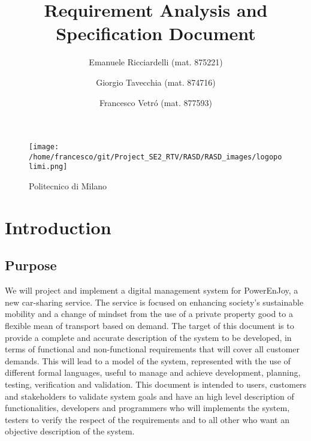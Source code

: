 \documentclass[10pt, a4paper,titlepage]{article}
\begin{document}
\begin{titlepage}
\title{Requirement Analysis and Specification Document}
\author{Emanuele Ricciardelli (mat. 875221) \and Giorgio Tavecchia (mat. 874716) \and Francesco Vetr\'o (mat. 877593)}
\begin{figure}
\texttt{[image: /home/francesco/git/Project\_SE2\_RTV/RASD/RASD\_images/logopolimi.png]}
\caption{Politecnico di Milano}
\label{fig:logo}
\end{figure}
\maketitle
\end{titlepage}
\tableofcontents
\pagebreak
\section{Introduction}
\subsection{Purpose}
We will project and implement a digital management system for PowerEnJoy, a new car-sharing service. The service is focused on enhancing society's sustainable mobility and a change of mindset from the use of a private property good to a flexible mean of transport based on demand.
The target of this document is to provide a complete and accurate description of the system to be developed, in terms of functional and non-functional requirements that will cover all customer demands. This will lead to a model of the system, represented with the use of different formal languages, useful to manage and achieve development, planning, testing, verification and validation.
This document is intended to users, customers and stakeholders to validate system goals and have an high level description of functionalities, developers and programmers who will implements the system, testers to verify the respect of the requirements and to all other who want an objective description of the system.
\end{document}
